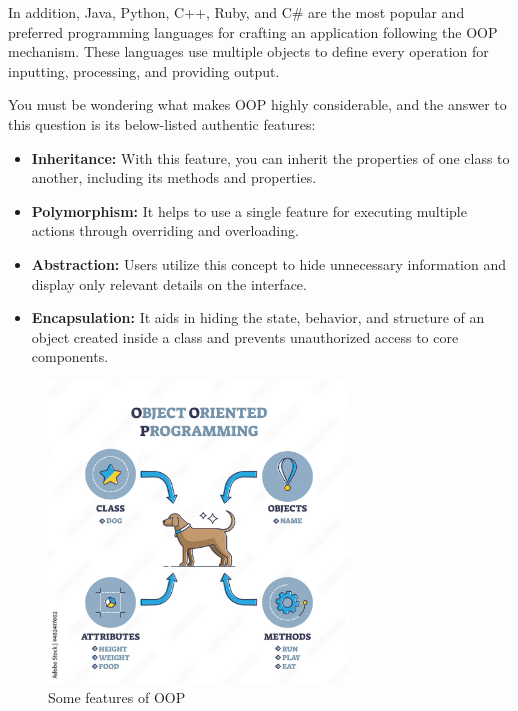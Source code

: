 \documentclass[12pt]{article}
\begin{document}
In addition, Java, Python, C++, Ruby, and C\# are the most popular and preferred programming languages for crafting an application following the OOP mechanism. These languages use multiple objects to define every operation for inputting, processing, and providing output.

You must be wondering what makes OOP highly considerable, and the answer to this question is its below-listed authentic features:
\begin{itemize}
    \item \textbf{Inheritance:} With this feature, you can inherit the properties of one class to another, including its methods and properties.
    \item \textbf{Polymorphism:} It helps to use a single feature for executing multiple actions through overriding and overloading.
    \item \textbf{Abstraction:} Users utilize this concept to hide unnecessary information and display only relevant details on the interface.
    \item \textbf{Encapsulation:} It aids in hiding the state, behavior, and structure of an object created inside a class and prevents unauthorized access to core components.
\end{itemize}

\begin{figure}[h!]
\begin{center}
\includegraphics[width=8cm]{Intro4.jpg}\\
Some features of OOP
\end{center}
\end{figure}

\vspace{1cm}
\end{document}
